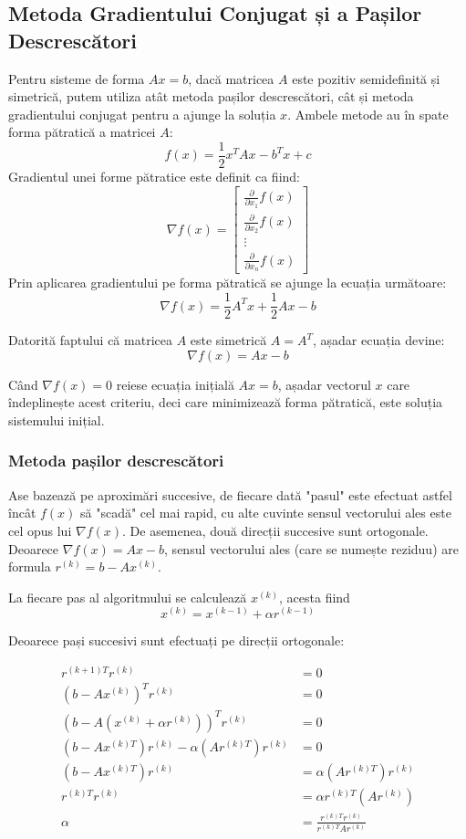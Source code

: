 \documentclass{exam}
\begin{document}
\subsection{Metoda Gradientului Conjugat și a Pașilor Descrescători}

Pentru sisteme de forma $Ax=b$, dacă matricea $A$ este pozitiv semidefinită și simetrică, putem utiliza atât metoda pașilor descrescători, cât și metoda gradientului conjugat pentru a ajunge la soluția $x$. 
Ambele metode au în spate forma pătratică a matricei $A$:
$$f(x)=\frac{1}{2}x^TAx-b^Tx+c$$
Gradientul unei forme pătratice este definit ca fiind:
$$\nabla f(x) = 
\begin{bmatrix}
\frac{\partial}{\partial x_1} f(x) \\
\frac{\partial}{\partial x_2} f(x) \\
\vdots \\
\frac{\partial}{\partial x_n} f(x)
\end{bmatrix}
$$
Prin aplicarea gradientului pe forma pătratică se ajunge la ecuația următoare:
$$\nabla f(x) = \frac{1}{2} A^T x + \frac{1}{2} A x - b$$

Datorită faptului că matricea $A$ este simetrică $A = A^T$, așadar ecuația devine:
$$\nabla f(x) = Ax-b$$

Când $\nabla f(x) = 0$ reiese ecuația inițială $Ax=b$, așadar vectorul $x$ care îndeplinește acest criteriu, deci care minimizează forma pătratică, este soluția sistemului inițial.


\subsubsection{Metoda pașilor descrescători} 

Ase bazează pe aproximări succesive, de fiecare dată "pasul" este efectuat astfel încât $f(x)$ să "scadă" cel mai rapid, cu alte cuvinte sensul vectorului ales este cel opus lui $\nabla f(x)$. De asemenea, două direcții succesive sunt ortogonale. Deoarece $\nabla f(x) = Ax-b$, sensul vectorului ales (care se numește reziduu) are formula $r^{(k)} = b - Ax^{(k)}$.

La fiecare pas al algoritmului se calculează $x^{(k)}$, acesta fiind
$$x^{(k)} = x^{(k-1)} + \alpha r^{(k-1)}$$ 

Deoarece pași succesivi sunt efectuați pe direcții ortogonale:

\begin{align*}
r^{(k + 1)T} r^{(k)} &= 0 \\
(b - Ax^{(k)})^T r^{(k)} &= 0 \\
(b - A(x^{(k)} + \alpha r^{(k)}))^T r^{(k)} &= 0 \\
(b - Ax^{(k)T}) r^{(k)} - \alpha (Ar^{(k)T}) r^{(k)} &= 0 \\
(b - Ax^{(k)T}) r^{(k)} &= \alpha (Ar^{(k)T}) r^{(k)} \\
r^{(k)T} r^{(k)} &= \alpha r^{(k)T} (Ar^{(k)}) \\
\alpha &= \frac{r^{(k)T} r^{(k)}}{r^{(k)T} Ar^{(k)}}
\end{align*}
\end{document}
